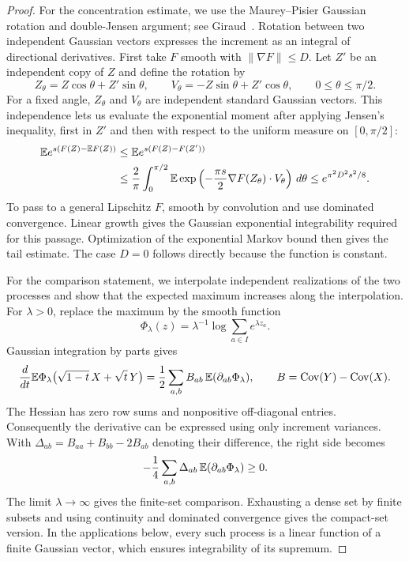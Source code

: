 \begin{proof}
For the concentration estimate, we use the Maurey--Pisier Gaussian
rotation and double-Jensen argument; see Giraud~\cite[Exercise~1.6.7,
equation~(1.10), parts~A--B]{Giraud2021}. Rotation between two independent
Gaussian vectors expresses the increment as an integral of directional
derivatives.
First take $F$ smooth with $\|\nabla F\|\le D$.
Let $Z'$ be an independent copy of $Z$ and define the rotation by
\[
 Z_\theta=Z\cos\theta+Z'\sin\theta,
 \qquad V_\theta=-Z\sin\theta+Z'\cos\theta,
 \qquad 0\le\theta\le\pi/2.
\]
For a fixed angle, $Z_\theta$ and $V_\theta$ are independent standard
Gaussian vectors.  This independence lets us evaluate the exponential
moment after applying Jensen's inequality, first in $Z'$ and then with
respect to the uniform measure on $[0,\pi/2]$:
\begin{align*}
 \mathbb E e^{s(F(Z)-\mathbb E F(Z))}
 &\le \mathbb E e^{s(F(Z)-F(Z'))}\\
 &\le \frac2\pi\int_0^{\pi/2}
     \mathbb E\exp\left(-\frac{\pi s}{2}
             \nabla F(Z_\theta)\cdot V_\theta\right)\,d\theta
 \le e^{\pi^2D^2s^2/8}.
\end{align*}
To pass to a general Lipschitz $F$, smooth by convolution and use dominated
convergence.  Linear growth gives the Gaussian exponential integrability
required for this passage.  Optimization of the exponential Markov bound
then gives the tail estimate.  The case $D=0$ follows directly because
the function is constant.

For the comparison statement, we interpolate independent realizations of
the two processes and show that the expected maximum increases along the
interpolation.  For $\lambda>0$, replace the maximum by the smooth function
\[
 \Phi_\lambda(z)=\lambda^{-1}\log\sum_{a\in I}e^{\lambda z_a}.
\]
Gaussian integration by parts gives
\[
 \frac{d}{dt}\mathbb E\Phi_\lambda
       \bigl(\sqrt{1-t}\,X+\sqrt t\,Y\bigr)
 =\frac12\sum_{a,b}B_{ab}\,\mathbb E(\partial_{ab}\Phi_\lambda),
 \qquad B=\operatorname{Cov}(Y)-\operatorname{Cov}(X).
\]
The Hessian has zero row sums and nonpositive off-diagonal entries.
Consequently the derivative can be expressed using only increment
variances.  With $\Delta_{ab}=B_{aa}+B_{bb}-2B_{ab}$ denoting their
difference, the right side becomes
\[
 -\frac14\sum_{a,b}\Delta_{ab}\,\mathbb E(\partial_{ab}\Phi_\lambda)\ge0.
\]
The limit $\lambda\to\infty$ gives the finite-set comparison.  Exhausting
a dense set by finite subsets and using continuity and dominated convergence
gives the compact-set version.  In the applications below, every such
process is a linear function of a finite Gaussian vector, which ensures
integrability of its supremum.
\end{proof}

